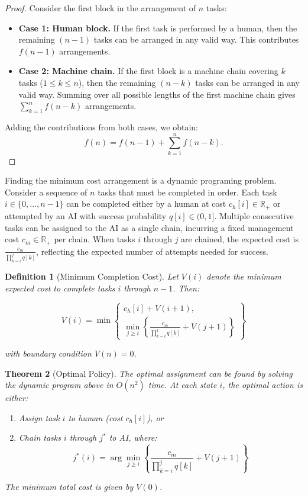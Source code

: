 \documentclass{article}
\newtheorem{theorem}{Theorem}
\newtheorem{definition}[theorem]{Definition}
\begin{document}
  \begin{proof}
  Consider the first block in the arrangement of $n$ tasks:
  \begin{itemize}
      \item \textbf{Case 1: Human block.} If the first task is performed by a human, then the remaining $(n-1)$ tasks can be arranged in any valid way. This contributes $f(n-1)$ arrangements.
      \item \textbf{Case 2: Machine chain.} If the first block is a machine chain covering $k$ tasks ($1 \leq k \leq n$), then the remaining $(n-k)$ tasks can be arranged in any valid way. Summing over all possible lengths of the first machine chain gives $\sum_{k=1}^{n} f(n-k)$ arrangements.
  \end{itemize}
  Adding the contributions from both cases, we obtain:
  \[
  f(n) = f(n-1) + \sum_{k=1}^{n} f(n-k).
  \]
  \end{proof}
 
Finding the minimum cost arrangement is a dynamic programing problem.
Consider a sequence of $n$ tasks that must be completed in order. 
Each task $i \in \{0,\ldots,n-1\}$ can be completed either by a human at cost $c_h[i] \in \mathbb{R}_+$ or attempted by an AI with success probability $q[i] \in (0,1]$.
Multiple consecutive tasks can be assigned to the AI as a single chain, incurring a fixed management cost $c_m \in \mathbb{R}_+$ per chain. 
When tasks $i$ through $j$ are chained, the expected cost is $\frac{c_m}{\prod_{k=i}^j q[k]}$, reflecting the expected number of attempts needed for success.

\begin{definition}[Minimum Completion Cost]
Let $V(i)$ denote the minimum expected cost to complete tasks $i$ through $n-1$. Then:

\begin{equation}
V(i) = \min\left\{
\begin{array}{l}
c_h[i] + V(i+1), \\[1ex]
\displaystyle\min_{j \geq i} \left\{\frac{c_m}{\prod_{k=i}^j q[k]} + V(j+1)\right\}
\end{array}
\right\}
\end{equation}

with boundary condition $V(n) = 0$.
\end{definition}

\begin{theorem}[Optimal Policy]
The optimal assignment can be found by solving the dynamic program above in $O(n^2)$ time. At each state $i$, the optimal action is either:
\begin{enumerate}
    \item Assign task $i$ to human (cost $c_h[i]$), or
    \item Chain tasks $i$ through $j^*$ to AI, where:
    \begin{equation}
        j^*(i) = \arg\min_{j \geq i} \left\{\frac{c_m}{\prod_{k=i}^j q[k]} + V(j+1)\right\}
    \end{equation}
\end{enumerate}
The minimum total cost is given by $V(0)$.
\end{theorem}
\end{document}
